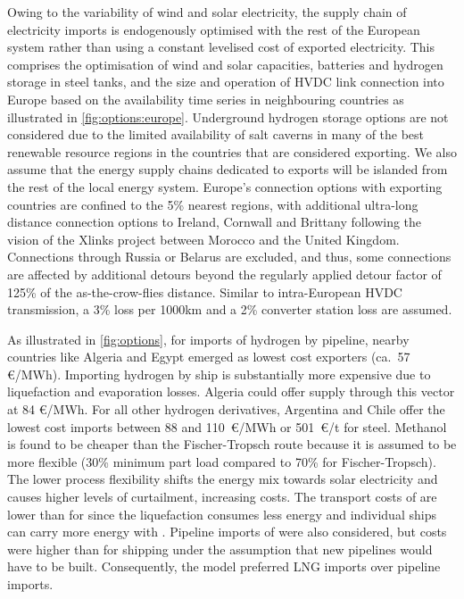 \documentclass[5p,10pt]{elsarticle}
\begin{document}
Owing to the variability of wind and solar electricity, the supply chain of
electricity imports is endogenously optimised with the rest of the European
system rather than using a constant levelised cost of exported electricity. This
comprises the optimisation of wind and solar capacities, batteries and hydrogen
storage in steel tanks, and the size and operation of HVDC link connection into
Europe based on the availability time series in neighbouring countries as
illustrated in \cref{fig:options:europe}. Underground hydrogen storage options
are not considered due to the limited availability of salt caverns in many of
the best renewable resource regions in the countries that are considered
exporting.\cite{hevinUndergroundStorage2019} We also assume that the energy
supply chains dedicated to exports will be islanded from the rest of the local
energy system. Europe's connection options with exporting countries are confined
to the 5\% nearest regions, with additional ultra-long distance connection
options to Ireland, Cornwall and Brittany following the vision of the Xlinks
project between Morocco and the United Kingdom.\cite{xlinksMoroccoUKPower2023}
Connections through Russia or Belarus are excluded, and thus, some connections
are affected by additional detours beyond the regularly applied detour factor of
125\% of the as-the-crow-flies distance. Similar to intra-European HVDC
transmission, a 3\% loss per 1000km and a 2\% converter station loss are assumed.


As illustrated in \cref{fig:options}, for imports of hydrogen by pipeline,
nearby countries like Algeria and Egypt emerged as lowest cost exporters (ca.~57
\euro{}/MWh). Importing hydrogen by ship is substantially more expensive due to
liquefaction and evaporation losses. Algeria could offer supply through this
vector at 84 \euro{}/MWh. For all other hydrogen derivatives, Argentina and
Chile offer the lowest cost imports between 88 and 110~\euro{}/MWh or
501~\euro{}/t for steel. Methanol is found to be cheaper than the
Fischer-Tropsch route because it is assumed to be more flexible (30\% minimum
part load compared to 70\% for
Fischer-Tropsch).\cite{brownUltralongdurationEnergy2023} The lower process
flexibility shifts the energy mix towards solar electricity and causes higher
levels of curtailment, increasing costs. The transport costs of  are
lower than for  since the liquefaction consumes less energy and
individual ships can carry more energy with . Pipeline imports of
 were also considered, but costs were higher than for 
shipping under the assumption that new pipelines would have to be built.
Consequently, the model preferred LNG imports over pipeline imports.
\end{document}
